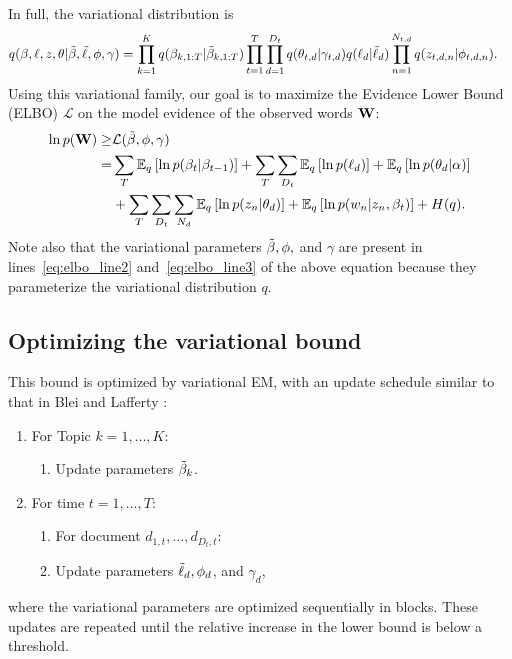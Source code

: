 In full, the variational distribution is
\begin{align}
  q(\beta, \ell, z, \theta | & \tilde{\beta}, \tilde{\ell}, \phi, \gamma) = \prod_{k=1}^K q(\beta_{k,1:T} | \tilde{\beta}_{k,1:T})
  \prod_{t=1}^T \prod_{d=1}^{D_t} q(\theta_{t,d} | \gamma_{t,d})
  q(\ell_{d} | \tilde{\ell}_{d})
  \prod_{n=1}^{N_{t,d}} q(z_{t,d,n} | \phi_{t,d,n}). \nonumber
\end{align}
Using this variational family, our goal is to maximize the Evidence Lower Bound (ELBO) $\mathcal{L}$ on the model evidence of the observed words $\textbf{W}$:
\begin{align}
  \label{eq:elbo}
  \ln p(\textbf{W}) \geq & \mathcal{L}(\tilde{\beta}, \phi, \gamma) \\
  = & \sum_T \mathbb{E}_q\left[\ln p(\beta_{t} | \beta_{t-1})\right] 
  + \sum_{T} \sum_{D_t} \mathbb{E}_q\left[\ln p(\ell_{d})\right] + \mathbb{E}_q\left[\ln p(\theta_{d} | \alpha)\right] \label{eq:elbo_line2} \\
  & + \sum_{T} \sum_{D_t} \sum_{N_d} \mathbb{E}_q\left[\ln p( z_n | \theta_d)\right] + \mathbb{E}_q\left[\ln p(w_n | z_n, \beta_t)\right]
  + H(q). \label{eq:elbo_line3}
\end{align}
Note also that the variational parameters $\tilde{\beta}, \phi,$ and $\gamma$
are present in lines~\ref{eq:elbo_line2} and~\ref{eq:elbo_line3} of
the above equation because they parameterize the variational
distribution $q$.

\subsection*{Optimizing the variational bound}
This bound is optimized by variational EM, with an update schedule similar to that in Blei and Lafferty \cite{blei:2006}:
\begin{enumerate}
\item For Topic $k=1, \ldots, K$:
  \begin{enumerate}
  \item Update parameters $\tilde{\beta}_k$.
  \end{enumerate}
\item For time $t = 1, \ldots, T$:
  \begin{enumerate}
  \item For document $d_{1,t}, \ldots, d_{{D_t}, t}$:
  \item Update parameters $\tilde{\ell}_d, \phi_d$, and $\gamma_d$,
    \end{enumerate}
  \end{enumerate}    
where the variational parameters are optimized sequentially in
blocks.  These updates are repeated until the relative increase in
the lower bound is below a threshold.

